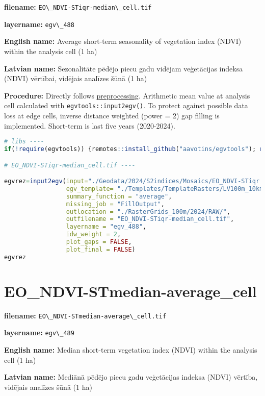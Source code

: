 \documentclass[
]{book}
\newcommand{\passthrough}[1]{#1}
\begin{document}
\textbf{filename:} \passthrough{\lstinline!EO\_NDVI-STiqr-median\_cell.tif!}

\textbf{layername:} \passthrough{\lstinline!egv\_488!}

\textbf{English name:} Average short-term seasonality of vegetation index (NDVI) within the analysis cell (1 ha)

\textbf{Latvian name:} Sezonalitāte pēdējo piecu gadu vidējam veģetācijas indeksa (NDVI) vērtībai, vidējais analīzes šūnā (1 ha)

\textbf{Procedure:} Directly follows \hyperref[Ch04.13]{preprocessing}. Arithmetic mean value at analysis cell
calculated with \passthrough{\lstinline!egvtools::input2egv()!}. To protect against possible data loss at edge cells,
inverse distance weighted (power = 2) gap filling is implemented. Short-term is last five years (2020-2024).

\begin{lstlisting}[language=R]
# libs ----
if(!require(egvtools)) {remotes::install_github("aavotins/egvtools"); require(egvtools)}

# EO_NDVI-STiqr-median_cell.tif ----

egvrez=input2egv(input="./Geodata/2024/S2indices/Mosaics/EO_NDVI-STiqr.tif",
                 egv_template= "./Templates/TemplateRasters/LV100m_10km.tif",
                 summary_function = "average",
                 missing_job = "FillOutput",
                 outlocation = "./RasterGrids_100m/2024/RAW/",
                 outfilename = "EO_NDVI-STiqr-median_cell.tif",
                 layername = "egv_488",
                 idw_weight = 2,
                 plot_gaps = FALSE,
                 plot_final = FALSE)
egvrez
\end{lstlisting}

\section{EO\_NDVI-STmedian-average\_cell}\label{ch06.489}

\textbf{filename:} \passthrough{\lstinline!EO\_NDVI-STmedian-average\_cell.tif!}

\textbf{layername:} \passthrough{\lstinline!egv\_489!}

\textbf{English name:} Median short-term vegetation index (NDVI) within the analysis cell (1 ha)

\textbf{Latvian name:} Mediānā pēdējo piecu gadu veģetācijas indeksa (NDVI) vērtība, vidējais analīzes šūnā (1 ha)
\end{document}
